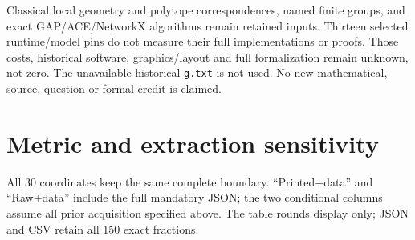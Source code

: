 \documentclass[a4paper,11pt]{article}
\begin{document}
Classical local geometry and polytope correspondences, named finite groups,
and exact GAP/ACE/NetworkX algorithms remain retained inputs. Thirteen selected
runtime/model pins do not measure their full implementations or proofs.
Those costs, historical software, graphics/layout and full formalization remain
unknown, not zero. The unavailable historical \texttt{g.txt} is not used.
No new mathematical, source, question or formal credit is claimed.
\newpage
\section*{Metric and extraction sensitivity}
All 30 coordinates keep the same complete boundary. ``Printed+data'' and
``Raw+data'' include the full mandatory JSON; the two conditional columns
assume all prior acquisition specified above. The table rounds display only;
JSON and CSV retain all 150 exact fractions.
\end{document}
